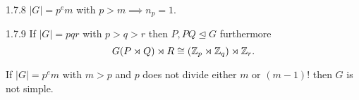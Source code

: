 \documentclass[11pt,leqno,oneside]{amsart}
\begin{document}
\begin{lem*}{1.7.8}
  \(|G|=p^e m\) with \(p > m \implies n_p = 1\).
\end{lem*}

\begin{prop*}{1.7.9}
  If \(|G|=pqr\) with \(p > q > r\) then \(P,PQ \unlhd G\) furthermore
  \[G (P \rtimes Q) \rtimes R \cong ({\mathbb Z}_p \rtimes {\mathbb Z}_q) \rtimes {\mathbb Z}_r.\]
\end{prop*}

\begin{prop*}
  If \(|G|=p^em\) with \(m > p\) and \(p\) does not divide either \(m\) or \((m-1)!\) then \(G\) is not simple.
\end{prop*}
\end{document}
